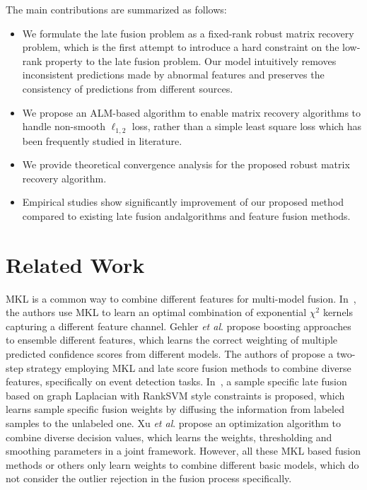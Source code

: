 \documentclass[letterpaper]{article} %
\def\etal{\emph{et al}.}
\begin{document}
The main contributions are summarized as follows:
\begin{itemize}
  \item We formulate the late fusion problem as a fixed-rank robust matrix recovery problem, which is the first attempt to introduce a hard constraint on the low-rank property to the late fusion problem.
      Our model intuitively removes inconsistent predictions made by abnormal features and preserves the consistency of predictions from different sources.
  \item We propose an ALM-based algorithm to enable matrix recovery algorithms to handle non-smooth $\ell_{1,2}$ loss, rather than a simple least square loss which has been frequently studied in literature.
  \item We provide theoretical convergence analysis for the proposed robust matrix recovery algorithm.
  \item Empirical studies show significantly improvement of our proposed method compared to existing late fusion andalgorithms and feature fusion methods.
\end{itemize}

\section{Related Work}

MKL is a common way to combine different features for multi-model fusion.
In~\cite{vedaldi2009multiple}, the authors use MKL to learn an optimal combination of exponential ${\chi}^2$ kernels capturing a different feature channel.
Gehler \etal \cite{gehler2009feature} propose boosting approaches to ensemble different features, which learns the correct weighting of multiple predicted confidence scores from different models.
The authors of \cite{natarajan2012multimodal} propose a two-step strategy employing MKL and late score fusion methods to combine diverse features, specifically on event detection tasks.
In~\cite{lai2015learning}, a sample specific late fusion based on graph Laplacian with RankSVM style constraints is proposed,
which learns sample specific fusion weights by diffusing the information from labeled samples to the unlabeled one.
Xu \etal \cite{xuiccv2013feature} propose an optimization algorithm to combine diverse decision values,
which learns the weights, thresholding and smoothing parameters in a joint framework.
However, all these MKL based fusion methods or others only learn weights to combine different basic models, which do not consider the outlier rejection in the fusion process specifically.
\end{document}
